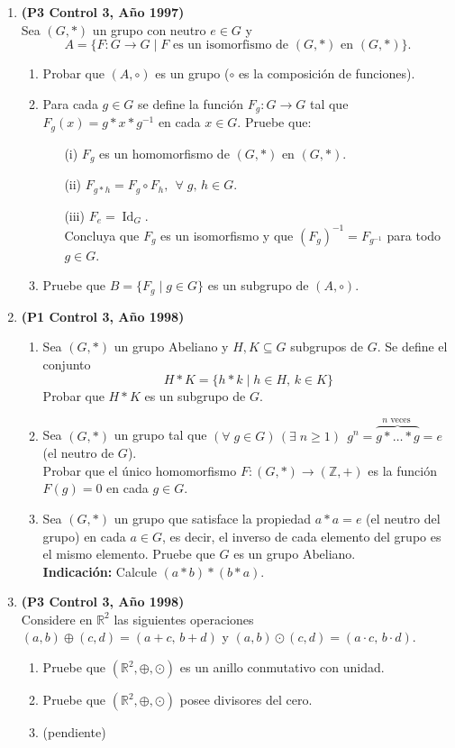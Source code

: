 \documentclass[11pt]{article}
\newcommand{\R}{\mathbb R}
\newcommand{\Z}{\mathbb Z}
\theoremstyle{plain}
\theoremstyle{definition}
\newcommand{\id}{\operatorname{Id}} %
\begin{document}
\begin{enumerate}
\item \textbf{(P3 Control 3, Año 1997)}\\
Sea $(G,*)$ un grupo con neutro $e\in G$ y 
$$A=\{F:G\longrightarrow G\;|\;F\mbox{ es un isomorfismo de $(G,*)$ en $(G,*)$}\}.$$
\begin{enumerate}
\item Probar que $(A,\circ)$ es un grupo ($\circ$ es la composición de funciones).
\item Para cada $g\in G$ se define la función $F_g:G\longrightarrow G$ tal que $F_g(x)=g*x*g^{-1}$ en cada $x\in G$. Pruebe que:
\begin{enumerate}
\item[(i)] $F_g$ es un homomorfismo de $(G,*)$ en $(G,*)$.
\item[(ii)] $F_{g*h}=F_g \circ F_h,\;\, \forall\;g,\,h\in G$.
\item[(iii)] $F_e=\id_{G}$.\\
Concluya que $F_g$ es un isomorfismo y que $(F_g)^{-1}=F_{g^{-1}}$ para todo $g\in G$.
\end{enumerate}
\item Pruebe que $B=\{F_g\;|\;g\in G\}$ es un subgrupo de $(A,\circ)$.
\end{enumerate}

\item \textbf{(P1 Control 3, Año 1998)}
\begin{enumerate}
\item Sea $(G,*)$ un grupo Abeliano y $H,K\subseteq G$ subgrupos de $G$. Se define el conjunto
$$H*K=\{h*k\;|\;h\in H,\,k\in K\}$$
Probar que $H*K$ es un subgrupo de $G$.
\item Sea $(G,*)$ un grupo tal que $(\forall\; g\in G) \,(\exists\;n\geq 1)\;\, g^{n}=\overbrace{g*\ldots*g}^{\mbox{$n$ veces }}=e$ (el neutro de $G$).\\ 
Probar que el único homomorfismo $F: (G,*)\longrightarrow (\Z,+)$ es la función $F(g)=0$ en cada $g\in G$.
\item Sea $(G,*)$ un grupo que satisface la propiedad $a*a=e$ (el neutro del grupo) en cada $a\in G$, es decir, el inverso de cada elemento del grupo es el mismo elemento. Pruebe que $G$ es un grupo Abeliano.\\
\textbf{Indicación:} Calcule $(a*b)*(b*a)$.
\end{enumerate}

\item \textbf{(P3 Control 3, Año 1998)}\\
Considere en $\R^2$ las siguientes operaciones $(a,b)\oplus (c,d)=(a+c,\,b+d)$ y $(a,b)\odot (c,d)=(a\cdot c,\, b\cdot d)$.
\begin{enumerate}
\item Pruebe que $(\R^2, \oplus, \odot)$ es un anillo conmutativo con unidad.
\item Pruebe que $(\R^2, \oplus, \odot)$ posee divisores del cero.
\item (pendiente)
\end{enumerate}


\end{enumerate}
\end{document}
